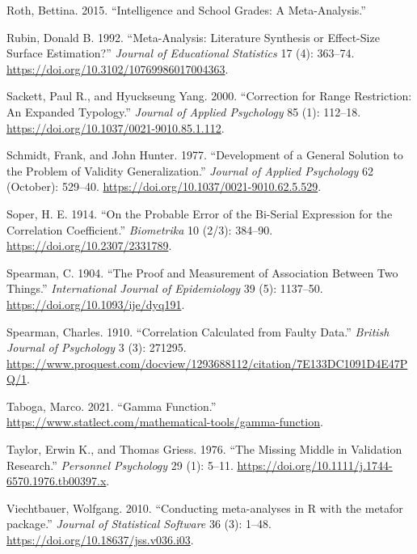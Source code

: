 \documentclass[
  letterpaper,
  DIV=11,
  numbers=noendperiod]{scrreprt}
\newlength{\cslhangindent}
\newenvironment{CSLReferences}[2] %
 {\begin{list}{}{%
  \setlength{\itemindent}{0pt}
  \setlength{\leftmargin}{0pt}
  \setlength{\parsep}{0pt}
  \ifodd #1
   \setlength{\leftmargin}{\cslhangindent}
   \setlength{\itemindent}{-1\cslhangindent}
  \fi
  \setlength{\itemsep}{#2\baselineskip}}}
 {\end{list}}
\begin{document}
\begin{CSLReferences}{1}{0}
Roth, Bettina. 2015. {``Intelligence and School Grades: A
Meta-Analysis.''}

Rubin, Donald B. 1992. {``Meta-Analysis: Literature Synthesis or
Effect-Size Surface Estimation?''} \emph{Journal of Educational
Statistics} 17 (4): 363--74.
\url{https://doi.org/10.3102/10769986017004363}.

Sackett, Paul R., and Hyuckseung Yang. 2000. {``Correction for Range
Restriction: An Expanded Typology.''} \emph{Journal of Applied
Psychology} 85 (1): 112--18.
\url{https://doi.org/10.1037/0021-9010.85.1.112}.

Schmidt, Frank, and John Hunter. 1977. {``Development of a General
Solution to the Problem of Validity Generalization.''} \emph{Journal of
Applied Psychology} 62 (October): 529--40.
\url{https://doi.org/10.1037/0021-9010.62.5.529}.

Soper, H. E. 1914. {``On the Probable Error of the Bi-Serial Expression
for the Correlation Coefficient.''} \emph{Biometrika} 10 (2/3): 384--90.
\url{https://doi.org/10.2307/2331789}.

Spearman, C. 1904. {``The Proof and Measurement of Association Between
Two Things.''} \emph{International Journal of Epidemiology} 39 (5):
1137--50. \url{https://doi.org/10.1093/ije/dyq191}.

Spearman, Charles. 1910. {``Correlation Calculated from Faulty Data.''}
\emph{British Journal of Psychology} 3 (3): 271295.
\url{https://www.proquest.com/docview/1293688112/citation/7E133DC1091D4E47PQ/1}.

Taboga, Marco. 2021. {``Gamma Function.''}
\url{https://www.statlect.com/mathematical-tools/gamma-function}.

Taylor, Erwin K., and Thomas Griess. 1976. {``The Missing Middle in
Validation Research.''} \emph{Personnel Psychology} 29 (1): 5--11.
\url{https://doi.org/10.1111/j.1744-6570.1976.tb00397.x}.

Viechtbauer, Wolfgang. 2010. {``Conducting meta-analyses in R with the
metafor package.''} \emph{Journal of Statistical Software} 36 (3):
1--48. \url{https://doi.org/10.18637/jss.v036.i03}.


\end{CSLReferences}
\end{document}
